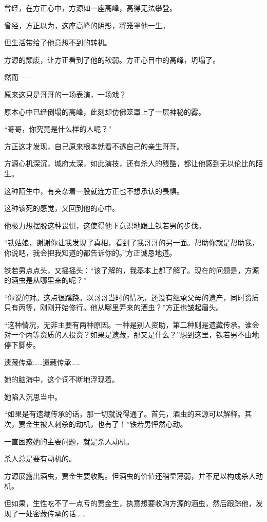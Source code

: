 
\begin{this_body}

曾经，在方正心中，方源如一座高峰，高得无法攀登。

曾经，方正以为，这座高峰的阴影，将笼罩他一生。

但生活带给了他意想不到的转机。

方源的颓废，让方正看到了他的软弱。方正心目中的高峰，坍塌了。

然而——

原来这只是哥哥的一场表演，一场戏？

原本心中已经倒塌的高峰，此刻却仿佛笼罩上了一层神秘的雾。

“哥哥，你究竟是什么样的人呢？”

方正这才发现，自己原来根本就看不透自己的亲生哥哥。

方源心机深沉，城府太深，如此演技，还有杀人的残酷，都让他感到无以伦比的陌生。

这种陌生中，有夹杂着一股就连方正也不想承认的畏惧。

这种该死的感觉，又回到他的心中。

他极力想摆脱这种畏惧，这使得他下意识地跟上铁若男的步伐。

“铁姑娘，谢谢你让我发现了真相，看到了我哥哥的另一面。帮助你就是帮助我，你说吧，我会把我知道的都告诉你的。”方正诚恳地道。

铁若男点点头，又摇摇头：“该了解的，我基本上都了解了。现在的问题是，方源的酒虫是从哪里来的呢？”

“你说的对。这点很蹊跷。以哥哥当时的情况，还没有继承父母的遗产，同时资质只有丙等，刚刚开始修行。他从哪里弄来的酒虫？”方正也皱起眉头。

“这种情况，无非主要有两种原因。一种是别人资助，第二种则是遗藏传承。谁会对一个丙等资质的人投资？如果是遗藏，那又是什么？”想到这里，铁若男不由地停下脚步。

遗藏传承……遗藏传承……

她的脑海中，这个词不断地浮现着。

她陷入沉思当中。

“如果是有遗藏传承的话，那一切就说得通了。首先，酒虫的来源可以解释。其次，贾金生被人刺杀的动机，也有了！”铁若男怦然心动。

一直困惑她的主要问题，就是杀人动机。

杀人总是要有动机的。

方源展露出酒虫，贾金生要收购。但酒虫的价值还稍显薄弱，并不足以构成杀人动机。

但如果，生性吃不了一点亏的贾金生，执意想要收购方源的酒虫，然后跟踪他，发现了一处密藏传承的话……


\end{this_body}
